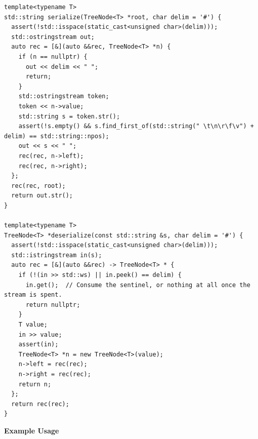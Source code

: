 \begin{lstlisting}[style=cpp]
template<typename T>
std::string serialize(TreeNode<T> *root, char delim = '#') {
  assert(!std::isspace(static_cast<unsigned char>(delim)));
  std::ostringstream out;
  auto rec = [&](auto &&rec, TreeNode<T> *n) {
    if (n == nullptr) {
      out << delim << " ";
      return;
    }
    std::ostringstream token;
    token << n->value;
    std::string s = token.str();
    assert(!s.empty() && s.find_first_of(std::string(" \t\n\r\f\v") + delim) == std::string::npos);
    out << s << " ";
    rec(rec, n->left);
    rec(rec, n->right);
  };
  rec(rec, root);
  return out.str();
}

template<typename T>
TreeNode<T> *deserialize(const std::string &s, char delim = '#') {
  assert(!std::isspace(static_cast<unsigned char>(delim)));
  std::istringstream in(s);
  auto rec = [&](auto &&rec) -> TreeNode<T> * {
    if (!(in >> std::ws) || in.peek() == delim) {
      in.get();  // Consume the sentinel, or nothing at all once the stream is spent.
      return nullptr;
    }
    T value;
    in >> value;
    assert(in);
    TreeNode<T> *n = new TreeNode<T>(value);
    n->left = rec(rec);
    n->right = rec(rec);
    return n;
  };
  return rec(rec);
}
\end{lstlisting}
\textbf{Example Usage}\par
